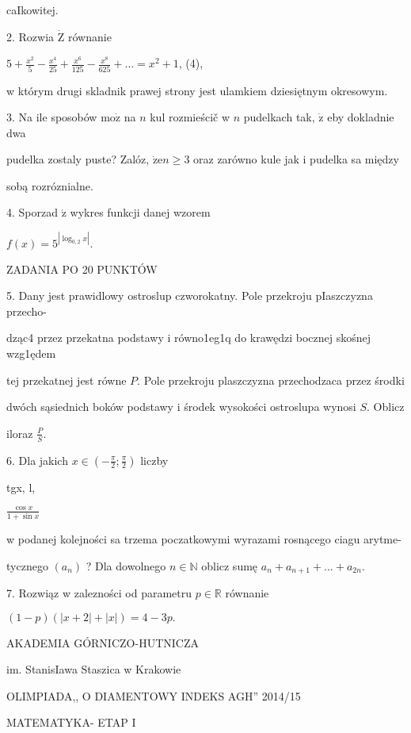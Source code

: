 \documentclass[a4paper,12pt]{article}
\begin{document}
caIkowitej.

2. Rozwia $\dot{\mathrm{Z}}$ równanie

$ 5+\displaystyle \frac{x^{2}}{5}-\frac{x^{4}}{25}+\frac{x^{6}}{125}-\frac{x^{8}}{625}+\ldots = x^{2}+1$, (4),

w którym drugi skladnik prawej strony jest ulamkiem dziesiętnym okresowym.

3. Na ile sposobów $\mathrm{m}\mathrm{o}\dot{\mathrm{z}}$ na $n$ kul rozmieścič w $n$ pudelkach tak, $\dot{\mathrm{z}}$ eby dokladnie dwa

pudelka zostaly puste? Zalóz, $\dot{\mathrm{z}}\mathrm{e}n\geq 3$ oraz zarówno kule jak i pudelka sa między

sobą rozróznialne.

4. Sporzad $\acute{\mathrm{z}}$ wykres funkcji danej wzorem

$f(x)=5^{|\log_{0,2}x|}.$

ZADANIA PO 20 PUNKTÓW

5. Dany jest prawidlowy ostroslup czworokatny. Pole przekroju pIaszczyzna przecho-

dząc4 przez przekatna podstawy i równo1eg1q do krawędzi bocznej skośnej wzg1ędem

tej przekatnej jest równe $P$. Pole przekroju plaszczyzna przechodzaca przez środki

dwóch sąsiednich boków podstawy i środek wysokości ostroslupa wynosi $S$. Oblicz

iloraz $\displaystyle \frac{P}{S}.$

6. Dla jakich $ x\in (-\displaystyle \frac{\pi}{2};\frac{\pi}{2})$ liczby

tgx, l,

$\displaystyle \frac{\cos x}{1+\sin x}$

w podanej kolejności sa trzema poczatkowymi wyrazami rosnącego ciagu arytme-

tycznego $(a_{n})$ ? Dla dowolnego $n\in \mathbb{N}$ oblicz sumę $a_{n}+a_{n+1}+\ldots+a_{2n}.$

7. Rozwiąz w zalezności od parametru $p\in \mathbb{R}$ równanie

$(1-p)(|x+2|+|x|)=4-3p.$






AKADEMIA GÓRNICZO-HUTNICZA

im. StanisIawa Staszica w Krakowie

OLIMPIADA,, O DIAMENTOWY INDEKS AGH'' 2014/15

MATEMATYKA- ETAP I
\end{document}
